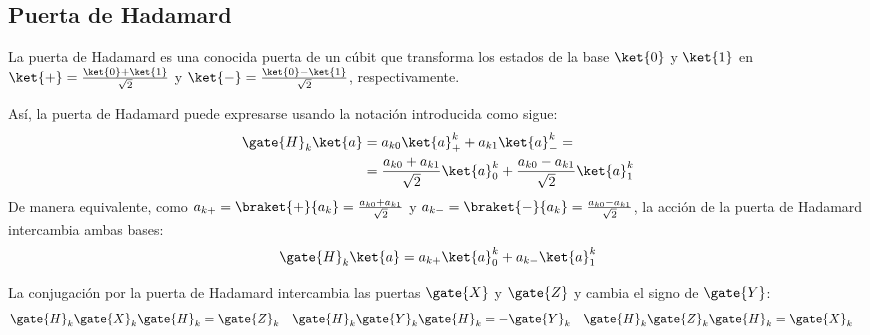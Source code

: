 \subsection{Puerta de Hadamard}
La puerta de Hadamard es una conocida puerta de un cúbit que transforma los estados de la base $\ket{0}$ y $\ket{1}$ en $\ket{+}=\frac{\ket{0}+\ket{1}}{\sqrt{2}}$ y $\ket{-}=\frac{\ket{0}-\ket{1}}{\sqrt{2}}$, respectivamente.

Así, la puerta de Hadamard puede expresarse usando la notación introducida como sigue:
\begin{equation}
  \label{eq:hadamard}
  \begin{split}
    \gate{H}_k\ket{a} & =a_{k0}\ket{a}^{k}_{+}+a_{k1}\ket{a}^{k}_{-}=                                                \\
                      & =\frac{a_{k0}+a_{k1}}{\sqrt{2}}\ket{a}^{k}_{0}+\frac{a_{k0}-a_{k1}}{\sqrt{2}}\ket{a}^{k}_{1}
  \end{split}
\end{equation}
De manera equivalente, como $a_{k+}=\braket{+}{a_k}=\frac{a_{k0}+a_{k1}}{\sqrt{2}}$
y $a_{k-}=\braket{-}{a_k}=\frac{a_{k0}-a_{k1}}{\sqrt{2}}$, la acción de
la puerta de Hadamard intercambia ambas bases:
\begin{equation*}
  \gate{H}_k\ket{a}=a_{k+}\ket{a}^{k}_{0}+a_{k-}\ket{a}^{k}_{1}
\end{equation*}

La conjugación por la puerta de Hadamard intercambia las puertas $\gate{X}$ y $\gate{Z}$ y cambia el signo de $\gate{Y}$:
\begin{align}
  \gate{H}_k\gate{X}_k\gate{H}_k & = \gate{Z}_k & \gate{H}_k\gate{Y}_k\gate{H}_k & = -\gate{Y}_k & \gate{H}_k\gate{Z}_k\gate{H}_k & = \gate{X}_k
\end{align}

